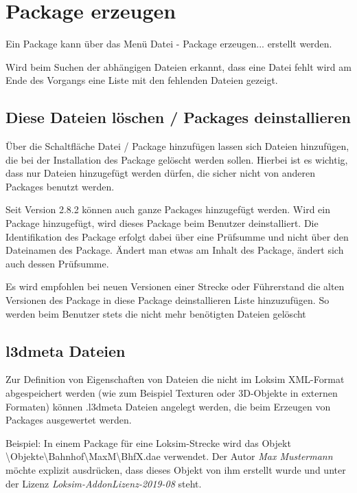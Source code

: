 \section{Package erzeugen}
\label{sec:editor.allg.packages}

Ein Package kann über das Menü Datei - Package erzeugen... erstellt werden.

Wird beim Suchen der abhängigen Dateien erkannt, dass eine Datei fehlt wird am Ende des Vorgangs eine Liste mit den fehlenden Dateien gezeigt.

\subsection{Diese Dateien löschen / Packages deinstallieren}

Über die Schaltfläche Datei / Package hinzufügen lassen sich Dateien
hinzufügen, die bei der Installation des Package gelöscht werden sollen.
Hierbei ist es wichtig, dass nur Dateien hinzugefügt werden dürfen, die
sicher nicht von anderen Packages benutzt werden.

Seit Version 2.8.2 können auch ganze Packages hinzugefügt werden. Wird
ein Package hinzugefügt, wird dieses Package beim Benutzer
deinstalliert. Die Identifikation des Package erfolgt dabei über eine
Prüfsumme und nicht über den Dateinamen des Package. Ändert man etwas am
Inhalt des Package, ändert sich auch dessen Prüfsumme.

Es wird empfohlen bei neuen Versionen einer Strecke oder Führerstand die
alten Versionen des Package in diese Package deinstallieren Liste
hinzuzufügen. So werden beim Benutzer stets die nicht mehr benötigten
Dateien gelöscht

\subsection{l3dmeta Dateien}
\label{sec:editor.allg.packages.l3dmeta}
Zur Definition von Eigenschaften von Dateien die nicht im Loksim XML-Format abgespeichert werden (wie zum Beispiel Texturen oder 3D-Objekte in externen Formaten) können
.l3dmeta Dateien angelegt werden, die beim Erzeugen von Packages ausgewertet werden.

Beispiel: In einem Package für eine Loksim-Strecke wird das Objekt 
\textbackslash Objekte\textbackslash\linebreak[0]Bahnhof\textbackslash MaxM\textbackslash BhfX.dae
 verwendet. 
Der Autor \emph{Max Mustermann} möchte 
explizit ausdrücken, dass dieses Objekt von ihm erstellt wurde und unter der Lizenz \emph{Loksim-AddonLizenz-2019-08} steht.

